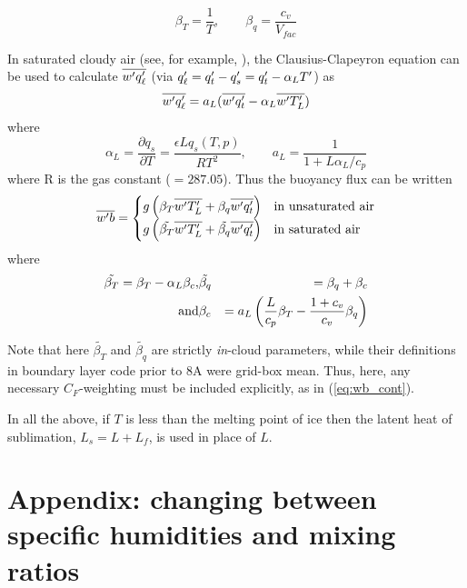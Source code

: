 \documentclass{UMDP_article}
\begin{document}
\begin{equation*}
  \beta_T  = \frac{1}{T}, \qquad \beta_q = \frac{c_v}{V_{fac}} 
\end{equation*}

In saturated cloudy air (see, for example, \cite{stage1981}), the
Clausius-Clapeyron equation can be used to calculate $
\overline{w'q_{\ell}'} $ (via $q_{\ell}' = q_t' - q_s' = q_t' - \alpha_L T'$) as
\begin{equation*}
  \overline{w'q_{\ell}'} = a_L( \overline{w'q_t'} - \alpha_L \overline{w'T_L'} )
\end{equation*}
where 
\begin{equation*}
  \alpha_L  = \frac{\partial q_s}{\partial T} = \frac{\epsilon L q_s(T,p) }{R T^2}, \qquad
  a_L   = \frac{1}{1+L\alpha_L/c_p}
\end{equation*}
where R is the gas constant ($=287.05$).  Thus the buoyancy flux can
be written
\begin{equation*}
  \overline{w'b} = 
\begin{cases}
  g \left( \beta_T \overline{w'T_L'} + \beta_q \overline{w'q_t'} \right)
  & {\rm in\ unsaturated\ air} \\
  g \left( \tilde{\beta_T} \overline{w'T_L'} + \tilde{\beta_q} \overline{w'q_t'}
  \right) & {\rm in\ saturated\ air}
\end{cases}
\end{equation*}
where 
\begin{eqnarray*}
  \tilde{\beta_T}  = \beta_T - \alpha_L \beta_c, &
  \tilde{\beta_q} & = \beta_q + \beta_c \\
  {\rm and}    &
  \beta_c & = a_L \left(   \frac{L}{c_p}     \beta_T 
    - \frac{1+c_v}{c_v} \beta_q \right) 
\end{eqnarray*}

Note that here $\tilde{\beta_T}$ and $\tilde{\beta_q}$ are strictly
{\em in}-cloud parameters, while their definitions in boundary layer
code prior to 8A were grid-box mean.  Thus, here, any necessary
$C_F$-weighting must be included explicitly, as in (\ref{eq:wb_cont}).

In all the above, if $T$ is less than the melting point of ice then
the latent heat of sublimation, $L_s = L + L_f$, is used in place of
$L$.

\newpage
\section{Appendix: changing between specific humidities and mixing ratios}
\label{app:mixratio}
\end{document}
